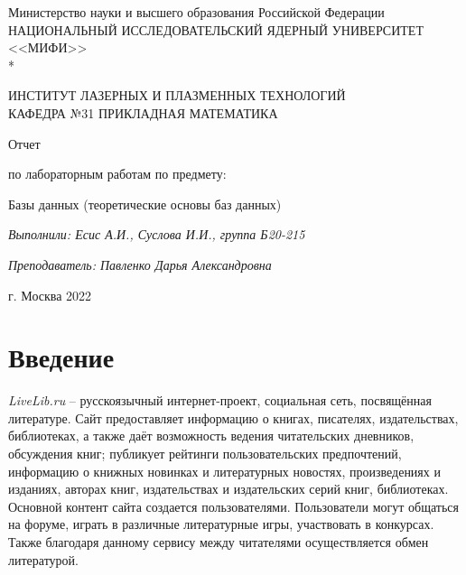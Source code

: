 \documentclass[a4paper,12pt]{article}
\begin{document}
\renewcommand{\contentsname}{\Large Содержание}
\renewcommand{\bibname}{\normalfont\Large\bfseries Список литературы}

\begin{titlepage}
    \begin{center}
        Министерство науки и высшего образования Российской Федерации \\
        НАЦИОНАЛЬНЫЙ ИССЛЕДОВАТЕЛЬСКИЙ ЯДЕРНЫЙ УНИВЕРСИТЕТ <<МИФИ>> \\*
        \hrulefill
    \end{center}

    \begin{center}
        ИНСТИТУТ ЛАЗЕРНЫХ И ПЛАЗМЕННЫХ ТЕХНОЛОГИЙ\\
        КАФЕДРА №31 ПРИКЛАДНАЯ МАТЕМАТИКА
    \end{center}
    \vspace{1cm}

    \vspace{2em}

    \begin{center}
        \large{Отчет}

        по лабораторным работам по предмету:

        Базы данных (теоретические основы баз данных)
    \end{center}

    \begin{center}
        \textit{Выполнили: Есис А.И., Суслова И.И., группа Б20-215}

        \textit{Преподаватель: Павленко Дарья Александровна}
    \end{center}


    \vspace{31em}

    \begin{center}
        г. Москва 2022
    \end{center}
\end{titlepage}

\newpage
\tableofcontents
\setcounter{page}{3}

\newpage
\section{Введение}

\textsl{LiveLib.ru} -- русскоязычный интернет-проект, социальная сеть, посвящённая литературе. Сайт предоставляет информацию о книгах, писателях, издательствах, библиотеках, а также даёт возможность ведения читательских дневников, обсуждения книг; публикует рейтинги пользовательских предпочтений, информацию о книжных новинках и литературных новостях, произведениях и изданиях, авторах книг, издательствах и издательских серий книг, библиотеках. Основной контент сайта создается пользователями. Пользователи могут общаться на форуме, играть в различные литературные игры, участвовать в конкурсах. Также благодаря данному сервису между читателями осуществляется обмен литературой.
\end{document}
